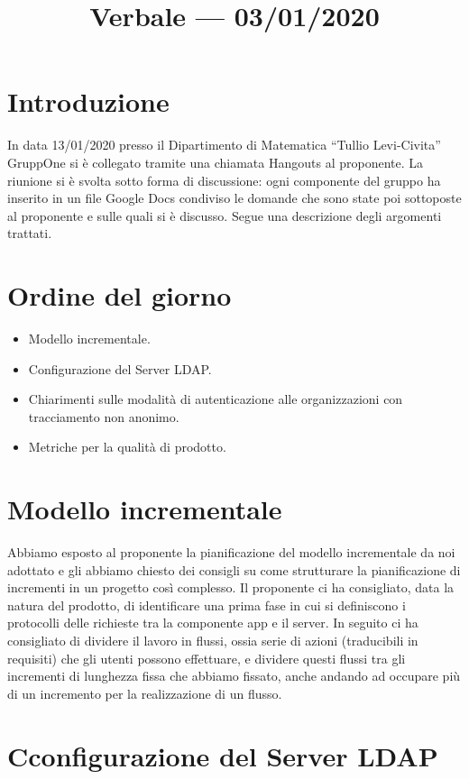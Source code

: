 \documentclass{article}
\title{Verbale --- 03/01/2020}
\begin{document}


\section{Introduzione}
\label{sec:introduzione}

In data 13/01/2020 presso il Dipartimento di Matematica ``Tullio Levi-Civita'' GruppOne si è collegato tramite una chiamata Hangouts al proponente. La riunione si è svolta sotto forma di discussione: ogni componente del gruppo ha inserito in un file Google Docs condiviso le domande che sono state poi sottoposte al proponente e sulle quali si è discusso. Segue una descrizione degli argomenti trattati.

\section{Ordine del giorno}%
\label{sec:ordine_del_giorno}

\begin{itemize}
  \item Modello incrementale.
  \item Configurazione del Server LDAP.
  \item Chiarimenti sulle modalità di autenticazione alle organizzazioni con tracciamento non anonimo.
  \item Metriche per la qualità di prodotto.
\end{itemize}

\section{Modello incrementale}%
\label{sec:modello_incrementale}

Abbiamo esposto al proponente la pianificazione del modello incrementale da noi adottato e gli abbiamo chiesto dei consigli su come strutturare la pianificazione di incrementi in un progetto così complesso. Il proponente ci ha consigliato, data la natura del prodotto, di identificare una prima fase in cui si definiscono i protocolli delle richieste tra la componente app e il server. In seguito ci ha consigliato di dividere il lavoro in flussi, ossia serie di azioni (traducibili in requisiti) che gli utenti possono effettuare, e dividere questi flussi tra gli incrementi di lunghezza fissa che abbiamo fissato, anche andando ad occupare più di un incremento per la realizzazione di un flusso.

\section{Cconfigurazione del Server LDAP}%
\label{sec:obiettivi_in_uscita_alla_RQ}
\end{document}
